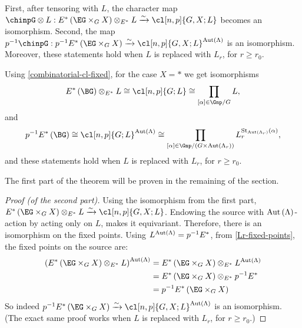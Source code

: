 \begin{theorem}\label{theorem-c}
	First, after tensoring with $L$, the character map
	$\chinpG \otimes L: E^*\left(\EG \times_G X\right) \otimes_{E^*} L \xrightarrow{\sim} \cl[n,p]{G,X; L}$
	becomes an isomorphism.
	Second, the map
	$p^{-1}\chinpG: p^{-1} E^*\left(\EG \times_G X\right) \xrightarrow{\sim} \cl[n,p]{G,X; L}^{\aut \left(\Lambda\right)}$
	is an isomorphism.
	Moreover, these statements hold when $L$ is replaced with $L_r$, for $r \geq r_0$.
\end{theorem}

\begin{corollary}
	Using \ref{combinatorial-cl-fixed}, for the case $X = *$ we get isomorphisms
	$$
	E^*\left(\BG\right) \otimes_{E^*} L
	\cong \cl[n,p]{G; L}
	\cong \prod_{\left[\alpha\right] \in \Gnp/G} L,
	$$
	and
	$$
	p^{-1} E^*\left(\BG\right)
	\cong \cl[n,p]{G; L}^{\aut \left(\Lambda\right)}
	\cong \prod_{\left[\alpha\right] \in \Gnp/{\left(G \times \aut \left(\Lambda_r\right)\right)}}
	L_r^{\stab_{\aut \left(\Lambda_r\right)}\left(\alpha\right)},
	$$
	and these statements hold when $L$ is replaced with $L_r$, for $r \geq r_0$.
\end{corollary}

The first part of the theorem will be proven in the remaining of the section.

\begin{proof}[Proof (of the second part)]
	Using the isomorphism from the first part,
	$E^*\left(\EG \times_G X\right) \otimes_{E^*} L \xrightarrow{\sim} \cl[n,p]{G,X; L}$.
	Endowing the source with $\operatorname{Aut} \left(\Lambda\right)$-action by acting only on $L$, makes it equivariant.
	Therefore, there is an isomorphism on the fixed points.
	Using $L^{\operatorname{Aut} \left(\Lambda\right)} = p^{-1} E^*$, from \ref{Lr-fixed-points}, the fixed points on the source are:
	\begin{align*}
		\left(E^*\left(\EG \times_G X\right) \otimes_{E^*} L\right)^{\aut \left(\Lambda\right)}
		&= E^*\left(\EG \times_G X\right) \otimes_{E^*} L^{\aut \left(\Lambda\right)}\\
		&= E^*\left(\EG \times_G X\right) \otimes_{E^*} p^{-1} E^*\\
		&= p^{-1} E^*\left(\EG \times_G X\right)
	\end{align*}
	So indeed $p^{-1} E^*\left(\EG \times_G X\right) \xrightarrow{\sim} \cl[n,p]{G,X; L}^{\aut \left(\Lambda\right)}$ is an isomorphism.
	(The exact same proof works when $L$ is replaced with $L_r$, for $r \geq r_0$.)
\end{proof}



